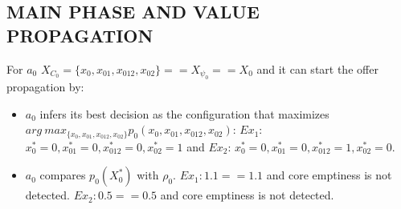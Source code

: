 \documentclass{article}
\begin{document}
\subsection{MAIN PHASE AND VALUE PROPAGATION}
\noindent For $a_0$ $X_{C_0}=\{x_0,x_{01},x_{012},x_{02}\}==X_{\psi_0}== X_0$
and it can start the offer propagation by:
\begin{itemize}
\item $a_0$ infers its best decision as the configuration
that maximizes \break$arg \
max_{\{x_{0},x_{01},x_{012},x_{02}\}}p_0(x_{0},x_{01},x_{012},x_{02})$:
$Ex_1$: $x^*_{0}=0,x^*_{01}=0,x^*_{012}=0,x^*_{02}=1$ and $Ex_2$:
$x^*_{0}=0,x^*_{01}=0,x^*_{012}=1,x^*_{02}=0$.
\item $a_0$ compares $p_0(X^*_0)$ with $\rho_0$. $Ex_1:1.1==1.1$ and core
emptiness is not detected. $Ex_2:0.5==0.5$ and core emptiness is not detected.


\end{itemize}
\end{document}
